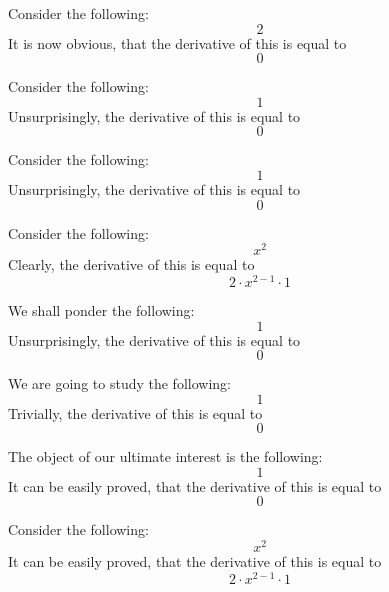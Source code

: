 \documentclass{article}
\begin{document}
Consider the following:
\begin{equation}
2 
\end{equation}
It is now obvious, that the derivative of this is equal to
\begin{equation}
0 
\end{equation}

Consider the following:
\begin{equation}
1 
\end{equation}
Unsurprisingly, the derivative of this is equal to
\begin{equation}
0 
\end{equation}

Consider the following:
\begin{equation}
1 
\end{equation}
Unsurprisingly, the derivative of this is equal to
\begin{equation}
0 
\end{equation}

Consider the following:
\begin{equation}
x ^{2 } 
\end{equation}
Clearly, the derivative of this is equal to
\begin{equation}
2 \cdot x ^{2 - 1 } \cdot 1 
\end{equation}

We shall ponder the following:
\begin{equation}
1 
\end{equation}
Unsurprisingly, the derivative of this is equal to
\begin{equation}
0 
\end{equation}

We are going to study the following:
\begin{equation}
1 
\end{equation}
Trivially, the derivative of this is equal to
\begin{equation}
0 
\end{equation}

The object of our ultimate interest is the following:
\begin{equation}
1 
\end{equation}
It can be easily proved, that the derivative of this is equal to
\begin{equation}
0 
\end{equation}

Consider the following:
\begin{equation}
x ^{2 } 
\end{equation}
It can be easily proved, that the derivative of this is equal to
\begin{equation}
2 \cdot x ^{2 - 1 } \cdot 1 
\end{equation}
\end{document}
